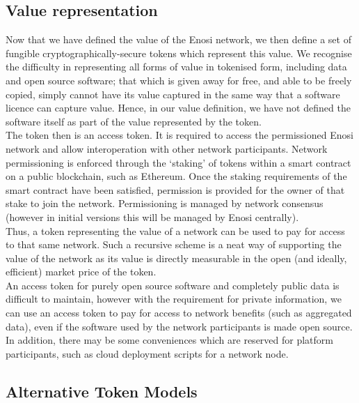 \documentclass{article}
\theoremstyle{definition}
\theoremstyle{plain} %
\begin{document}
\subsection{Value representation}

Now that we have defined the value of the Enosi network, we then define a set of fungible cryptographically-secure tokens which represent this value. We recognise the difficulty in representing all forms of value in tokenised form, including data and open source software; that which is given away for free, and able to be freely copied, simply cannot have its value captured in the same way that a software licence can capture value. Hence, in our value definition, we have not defined the software itself as part of the value represented by the token.\\

\noindent The token then is an access token. It is required to access the permissioned Enosi network and allow interoperation with other network participants. Network permissioning is enforced through the ‘staking’ of tokens within a smart contract on a public blockchain, such as Ethereum. Once the staking requirements of the smart contract have been satisfied, permission is provided for the owner of that stake to join the network. Permissioning is managed by network consensus (however in initial versions this will be managed by Enosi centrally).\\

\noindent Thus, a token representing the value of a network can be used to pay for access to that same network. Such a recursive scheme is a neat way of supporting the value of the network as its value is directly measurable in the open (and ideally, efficient) market price of the token.\\

\noindent An access token for purely open source software and completely public data is difficult to maintain, however with the requirement for private information, we can use an access token to pay for access to network benefits (such as aggregated data), even if the software used by the network participants is made open source. In addition, there may be some conveniences which are reserved for platform participants, such as cloud deployment scripts for a network node.

\subsection{Alternative Token Models}
\end{document}
